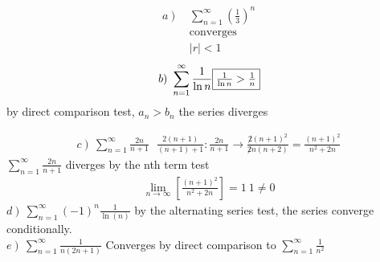 \documentclass{article}
\begin{document}
\section{}
	\begin{multicols}{2}
		\begin{align*}
			\left.a\right)\ &\sum\limits_{n=1}^{\infty}{\left(\frac{1}{3}\right)^n}\\
			&\text{converges}\\
			&\left|r\right|<1
		\end{align*}
		\vfill\columnbreak
		\begin{align*}
			\left.b\right)\ 
			\sum\limits_{n=1}^{\infty}{\frac{1}{\ln{n}}}
			\fbox{$\frac{1}{\ln{n}}>\frac{1}{n}$}
		\end{align*}
		by direct comparison test, $a_n>b_n$ the series diverges
	\end{multicols}
	\begin{align*}
		\left.c\right)\ \sum\limits_{n=1}^{\infty}{\frac{2n}{n+1}}\ \ \ \frac{2(n+1)}{(n+1)+1}: \frac{2n}{n+1}\rightarrow \frac{\not 2 (n+1)^2}{\not 2 n(n+2)}=\frac{(n+1)^2}{n^2+2n}
	\end{align*}
	$\sum\limits_{n=1}^{\infty}{\frac{2n}{n+1}}$ diverges by the nth term test
	\begin{align*}
		\lim\limits_{n\rightarrow \infty}\left[\frac{(n+1)^2}{n^2+2n}\right]=1\ 1\not=0
	\end{align*}
	$\left.d\right)\ \sum\limits_{n=1}^{\infty}{\left(-1\right)}^n\frac{1}{\ln(n)}$ by the alternating series test, the series converge conditionally.\\
	$\left.e\right)\ \sum\limits_{n=1}^{\infty}\frac{1}{n(2n+1)}$ Converges by direct comparison to $\sum\limits_{n=1}^{\infty}{\frac{1}{n^2}}$
	
\end{document}
